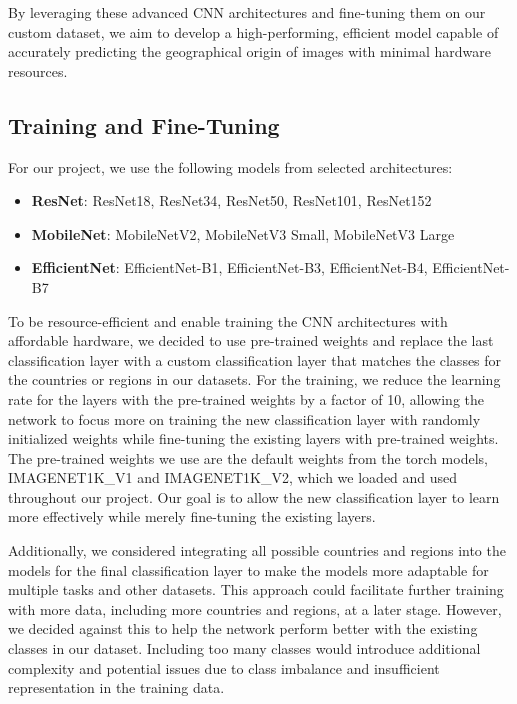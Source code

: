 \documentclass{article}
\providecommand{\tightlist}{%
  \setlength{\itemsep}{0pt}\setlength{\parskip}{0pt}}
\begin{document}
By leveraging these advanced CNN architectures and fine-tuning them on
our custom dataset, we aim to develop a high-performing, efficient model
capable of accurately predicting the geographical origin of images with
minimal hardware resources.

\subsection{Training and Fine-Tuning}\label{training-and-fine-tuning}

For our project, we use the following models from selected
architectures:

\begin{itemize}
\tightlist
\item
  \textbf{ResNet}: ResNet18, ResNet34, ResNet50, ResNet101, ResNet152
\item
  \textbf{MobileNet}: MobileNetV2, MobileNetV3 Small, MobileNetV3 Large
\item
  \textbf{EfficientNet}: EfficientNet-B1, EfficientNet-B3,
  EfficientNet-B4, EfficientNet-B7
\end{itemize}

To be resource-efficient and enable training the CNN architectures with
affordable hardware, we decided to use pre-trained weights and replace
the last classification layer with a custom classification layer that
matches the classes for the countries or regions in our datasets. For
the training, we reduce the learning rate for the layers with the
pre-trained weights by a factor of 10, allowing the network to focus
more on training the new classification layer with randomly initialized
weights while fine-tuning the existing layers with pre-trained weights.
The pre-trained weights we use are the default weights from the torch
models, IMAGENET1K\_V1 and IMAGENET1K\_V2, which we loaded and used
throughout our project. Our goal is to allow the new classification
layer to learn more effectively while merely fine-tuning the existing
layers.

Additionally, we considered integrating all possible countries and
regions into the models for the final classification layer to make the
models more adaptable for multiple tasks and other datasets. This
approach could facilitate further training with more data, including
more countries and regions, at a later stage. However, we decided
against this to help the network perform better with the existing
classes in our dataset. Including too many classes would introduce
additional complexity and potential issues due to class imbalance and
insufficient representation in the training data.
\end{document}
